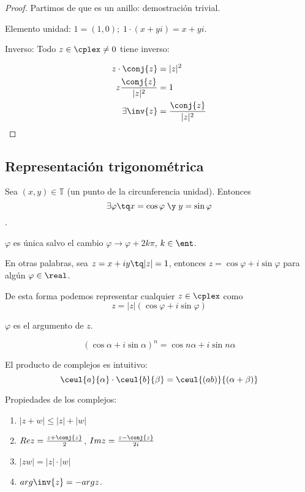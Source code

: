 \documentclass[nochap]{apuntes}
\begin{document}
\begin{proof}
Partimos de que es un anillo: demostración trivial.

Elemento unidad: $1=(1,0);\; 1\cdot(x+yi)=x+yi$.

Inverso: Todo $z \in \cplex \neq 0$ tiene inverso:

\begin{align*}
z\cdot \conj{z}&=|z|^2 \\
z \frac{\conj{z}}{|z|^2}&=1 \\
\exists \inv{z} &= \frac{\conj{z}}{|z|^2}
\end{align*}
\end{proof}

\subsection{Representación trigonométrica}

\begin{lemma} Sea $(x,y) \in \mathbb{T}$ (un punto de la circunferencia unidad). Entonces 
\[ \exists \varphi  \tq x=\cos \varphi \;\y\; y=\sin \varphi \].

$\varphi$ es única salvo el cambio $\varphi \to \varphi + 2k\pi$, $k\in \ent$.

En otras palabras, sea $z=x+iy \tq |z|=1$, entonces $z=\cos\varphi +i \sin \varphi$ para algún $\varphi \in \real$.
\end{lemma}

De esta forma podemos representar cualquier $z\in \cplex$ como 
\[ z=|z|\left(\cos \varphi + i \sin \varphi\right) \]

$\varphi$ es el argumento de $z$.

\begin{theorem}
\[ (\cos \alpha + i \sin \alpha)^n=\cos n\alpha+i\sin n\alpha \]
\end{theorem}

El producto de complejos es intuitivo:
\[\ceul{a}{\alpha}\cdot\ceul{b}{\beta}=\ceul{(ab)}{(\alpha+\beta)} \]

Propiedades de los complejos:

\begin{enumerate}
\item $|z+w|\leq |z|+|w|$
\item $Re z = \frac{z+\conj{z}}{2}$, $Im z = \frac{z-\conj{z}}{2i}$
\item $|zw| = |z| \cdot |w|$
\item $arg \inv{z} = -arg z$.
\end{enumerate}
\end{document}
